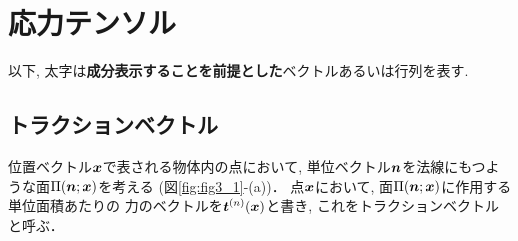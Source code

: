 \documentclass[10pt,a4j]{jbook}
\newlength{\minitwocolumn}
\begin{document}
\newcommand{\fat}[1]{\mbox{\boldmath $#1$}}
\newcommand{\D}{\partial}
\newcommand{\w}{\omega}
\newcommand{\ga}{\alpha}
\newcommand{\gb}{\beta}
\newcommand{\gx}{\xi}
\newcommand{\gz}{\zeta}
\newcommand{\vhat}[1]{\hat{\fat{#1}}}
\newcommand{\spc}{\vspace{0.7\baselineskip}}
\newcommand{\halfspc}{\vspace{0.3\baselineskip}}

\newcommand{\twofig}[2]
 {
   \begin{figure}
     \begin{minipage}[t]{\minitwocolumn}
         \begin{center}   #1
         \end{center}
     \end{minipage}
         \hspace{\columnsep}
     \begin{minipage}[t]{\minitwocolumn}
         \begin{center} #2
         \end{center}
     \end{minipage}
   \end{figure}
 }
\setcounter{chapter}{1}
\chapter{応力テンソル}
以下, 太字は{\bf 成分表示することを前提とした}ベクトルあるいは行列を表す.
\section{トラクションベクトル}
位置ベクトル$\fat{x}$で表される物体内の点において, 
単位ベクトル$\fat{n}$を法線にもつような面$\Pi(\fat{n};\fat{x})$を考える
(図\ref{fig:fig3_1}-(a))．
点$\fat{x}$において, 面$\Pi(\fat{n};\fat{x})$に作用する単位面積あたりの
力のベクトルを$\fat{t}^{(n)}(\fat{x})$と書き, これをトラクションベクトル
と呼ぶ．
\end{document}
